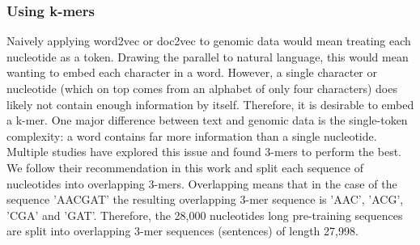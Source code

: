 \subsubsection{Using k-mers}\label{subsubsec:kmers}
Naively applying word2vec or doc2vec to genomic data would mean treating each nucleotide as a token. Drawing the parallel to natural language, this would mean wanting to embed each character in a word. However, a single character or nucleotide (which on top comes from an alphabet of only four characters) does likely not contain enough information by itself. Therefore, it is desirable to embed a k-mer.
One major difference between text and genomic data is the single-token complexity: a word contains far more information than a single nucleotide.
Multiple studies have explored this issue and found 3-mers to perform the best. %
 We follow their recommendation in this work and split each sequence of nucleotides into overlapping 3-mers. Overlapping means that in the case of the sequence 'AACGAT' the resulting overlapping 3-mer sequence is 'AAC', 'ACG', 'CGA' and 'GAT'. Therefore, the 28,000 nucleotides long pre-training sequences are split into overlapping 3-mer sequences (sentences) of length 27,998.
